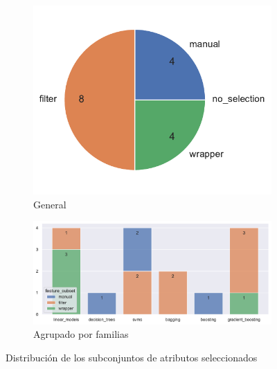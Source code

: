 \begin{figure}[h]
	\vspace{-8mm}
	\begin{center}
		\begin{subfigure}{0.35\linewidth}
			\begin{center}
				\includegraphics[width=\linewidth]{figs/chapter5/validation/fsfrequency}
				\caption{General}\label{fig:ch5fsgeneral}
			\end{center}
		\end{subfigure} 
		\begin{subfigure}{0.60\linewidth}
			\begin{center}
				\includegraphics[width=\linewidth]{figs/chapter5/validation/fsfamily}
				\caption{Agrupado por familias}\label{fig:ch5fsfamily}
			\end{center}
		\end{subfigure} 
	\end{center}
	\captionsetup{aboveskip=-5pt, belowskip=-25pt}
	\caption{Distribución de los subconjuntos de atributos seleccionados}
	\label{fig:ch5featuresubsets}
\end{figure}

